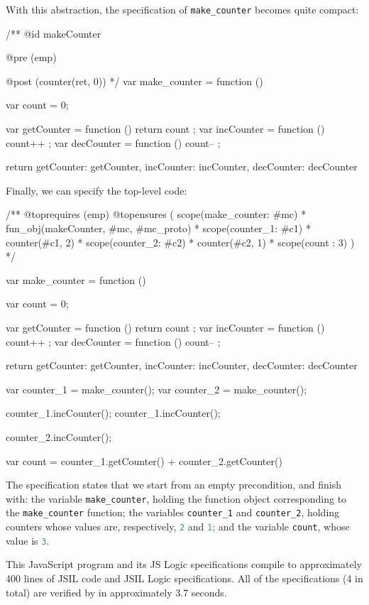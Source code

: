 \documentclass{llncs}
\def\jsinline{\lstinline[language=JavaScript, basicstyle=\small]}
\begin{document}
\medskip
With this abstraction, the specification of \jsinline|make_counter| becomes quite compact:

\medskip
\begin{lstjs}[firstnumber=1]
/**
  @id makeCounter

  @pre (emp)
  
  @post (counter(ret, 0))
*/
var make_counter = function () {
   var count = 0;

   var getCounter = function () { return count };
   var incCounter = function () { count++ };
   var decCounter = function () { count-- };

   return { getCounter: getCounter, incCounter: incCounter, decCounter: decCounter }
}
\end{lstjs}

\medskip
Finally, we can specify the top-level code:
\begin{lstjs}[firstnumber=1]
/**
 @toprequires (emp)
 @topensures (
   scope(make_counter: #mc) *
   fun_obj(makeCounter, #mc, #mc_proto) *
   scope(counter_1: #c1) * counter(#c1, 2) *
   scope(counter_2: #c2) * counter(#c2, 1) *
   scope(count : 3)
 )
*/

var make_counter = function () {
   var count = 0;

   var getCounter = function () { return count };
   var incCounter = function () { count++ };
   var decCounter = function () { count-- };

   return { getCounter: getCounter, incCounter: incCounter, decCounter: decCounter }
}

var counter_1 = make_counter();
var counter_2 = make_counter();

counter_1.incCounter();
counter_1.incCounter();

counter_2.incCounter();

var count = counter_1.getCounter() + counter_2.getCounter()
\end{lstjs}

The specification states that we start from an empty precondition, and finish with: the variable \jsinline|make_counter|, holding the function object corresponding to the \jsinline|make_counter| function; the variables \jsinline|counter_1| and \jsinline|counter_2|, holding counters whose values are, respectively, \jsinline|2| and \jsinline|1|; and the variable \jsinline|count|, whose value is \jsinline|3|.

This JavaScript program and its JS Logic specifications compile to approximately 400 lines of JSIL code and JSIL Logic specifications. All of the specifications (4 in total) are verified by \javert in approximately 3.7 seconds. 
\end{document}
